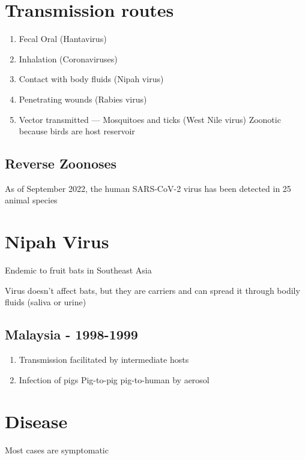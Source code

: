 \documentclass{notes}
\begin{document}
\section{Transmission routes}

\begin{enumerate}
    \item Fecal Oral (Hantavirus)
    \item Inhalation (Coronaviruses)
    \item Contact with body fluids (Nipah virus)
    \item Penetrating wounds (Rabies virus)
    \item Vector transmitted — Mosquitoes and ticks (West Nile virus)
    \subitem Zoonotic because birds are host reservoir
\end{enumerate}

\subsection{Reverse Zoonoses}

As of September 2022, the human SARS-CoV-2 virus has been detected in 25 animal species

\section{Nipah Virus}

Endemic to fruit bats in Southeast Asia

\tab \indicates Virus doesn't affect bats, but they are carriers and can spread it through bodily fluids (saliva or urine)

\subsection{Malaysia - 1998-1999}

\begin{enumerate}
    \item Transmission facilitated by intermediate hosts
    \item Infection of pigs
    \subitem Pig-to-pig \indicates pig-to-human by aerosol
\end{enumerate}

\section{Disease}

Most cases are symptomatic
\end{document}
